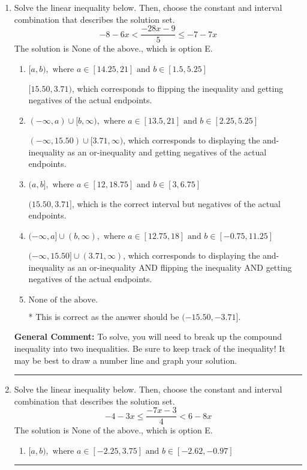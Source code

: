 \documentclass{extbook}[14pt]
\newcommand{\litem}[1]{\item #1

\rule{\textwidth}{0.4pt}}
\begin{document}
\begin{enumerate}
{\textbf{General Comment:} When thinking about this language, it helps to draw a number line and try points.
}
\litem{
Solve the linear inequality below. Then, choose the constant and interval combination that describes the solution set.
\[ -8 - 6 x < \frac{-28 x - 9}{5} \leq -7 - 7 x \]The solution is \( \text{None of the above.} \), which is option E.\begin{enumerate}[label=\Alph*.]
\item \( [a, b), \text{ where } a \in [14.25, 21] \text{ and } b \in [1.5, 5.25] \)

$[15.50, 3.71)$, which corresponds to flipping the inequality and getting negatives of the actual endpoints.
\item \( (-\infty, a) \cup [b, \infty), \text{ where } a \in [13.5, 21] \text{ and } b \in [2.25, 5.25] \)

$(-\infty, 15.50) \cup [3.71, \infty)$, which corresponds to displaying the and-inequality as an or-inequality and getting negatives of the actual endpoints.
\item \( (a, b], \text{ where } a \in [12, 18.75] \text{ and } b \in [3, 6.75] \)

$(15.50, 3.71]$, which is the correct interval but negatives of the actual endpoints.
\item \( (-\infty, a] \cup (b, \infty), \text{ where } a \in [12.75, 18] \text{ and } b \in [-0.75, 11.25] \)

$(-\infty, 15.50] \cup (3.71, \infty)$, which corresponds to displaying the and-inequality as an or-inequality AND flipping the inequality AND getting negatives of the actual endpoints.
\item \( \text{None of the above.} \)

* This is correct as the answer should be $(-15.50, -3.71]$.
\end{enumerate}

\textbf{General Comment:} To solve, you will need to break up the compound inequality into two inequalities. Be sure to keep track of the inequality! It may be best to draw a number line and graph your solution.
}
\litem{
Solve the linear inequality below. Then, choose the constant and interval combination that describes the solution set.
\[ -4 - 3 x \leq \frac{-7 x - 3}{4} < 6 - 8 x \]The solution is \( \text{None of the above.} \), which is option E.\begin{enumerate}[label=\Alph*.]
\item \( [a, b), \text{ where } a \in [-2.25, 3.75] \text{ and } b \in [-2.62, -0.97] \)


\end{enumerate}}
\end{enumerate}
\end{document}
